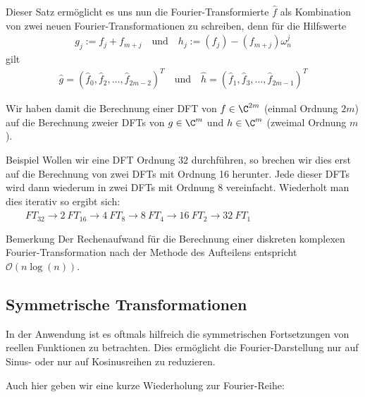 Dieser Satz ermöglicht es uns nun die Fourier-Transformierte $\hat{f}$ als Kombination von zwei neuen 
Fourier-Transformationen zu schreiben, denn für die Hilfswerte
%
\begin{align*}
  g_{j} := f_j + f_{m+j} 
  \quad \text{und}\quad 
  h_{j} := (f_j) - (f_{m+j})\omega_n^j
\end{align*}
%
gilt 
\begin{align*}
  \hat{g} = (\hat{f}_0,\hat{f}_2,\dots,\hat{f}_{2m-2})^T 
  \quad\text{und}\quad 
  \hat{h} = (\hat{f}_1,\hat{f}_3,\dots,\hat{f}_{2m-1})^T 
\end{align*}

Wir haben damit die Berechnung einer DFT von $f\in\C^{2m}$ (einmal Ordnung $2m$) auf die Berechnung zweier DFTs von 
$g\in\C^m$ und $h\in\C^m$ (zweimal Ordnung $m$). 

\begin{colbox}{Beispiel}
  Wollen wir eine DFT Ordnung $32$ durchführen, so brechen wir dies erst auf die Berechnung von zwei DFTs mit Ordnung 
  16 herunter. Jede dieser DFTs wird dann wiederum in zwei DFTs mit Ordnung 8 vereinfacht. Wiederholt man dies iterativ 
  so ergibt sich:\\
  $
  \qquad FT_{32} 
  \rightarrow 2\ FT_{16} 
  \rightarrow 4\ FT_{8} 
  \rightarrow 8\ FT_{4} 
  \rightarrow 16\ FT_{2} 
  \rightarrow 32\ FT_{1}
  $
\end{colbox}

\begin{colbox}{Bemerkung}
  Der Rechenaufwand für die Berechnung einer diskreten komplexen Fourier-Transformation nach der Methode des Aufteilens
  entspricht $\mathcal{O}(n\log(n))$.
\end{colbox}

\subsection{Symmetrische Transformationen}
In der Anwendung ist es oftmals hilfreich die symmetrischen Fortsetzungen von reellen Funktionen zu betrachten. Dies 
ermöglicht die Fourier-Darstellung nur auf Sinus- oder nur auf Kosinusreihen zu reduzieren.

Auch hier geben wir eine kurze Wiederholung zur Fourier-Reihe:

